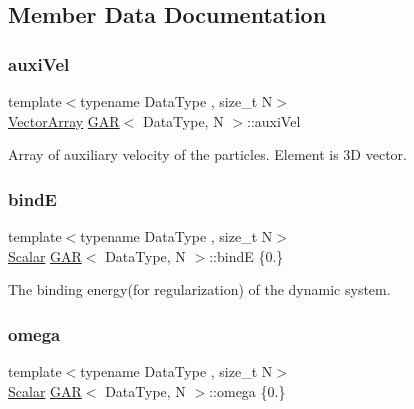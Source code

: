 \subsection{Member Data Documentation}
\mbox{\label{class_g_a_r_ade7c1f936a5f23a0ded2d02b2cc750e6}} 
\subsubsection{\texorpdfstring{auxi\+Vel}{auxiVel}}
{\footnotesize\ttfamily template$<$typename Data\+Type , size\+\_\+t N$>$ \\
\mbox{\hyperlink{class_g_a_r_a5818e17eb203504af6e10f38fc38d378}{Vector\+Array}} \mbox{\hyperlink{class_g_a_r}{G\+AR}}$<$ Data\+Type, N $>$\+::auxi\+Vel}



Array of auxiliary velocity of the particles. Element is 3D vector. 

\mbox{\label{class_g_a_r_a10f49216d9cacb2b21bd053a2ddb997c}} 
\subsubsection{\texorpdfstring{bindE}{bindE}}
{\footnotesize\ttfamily template$<$typename Data\+Type , size\+\_\+t N$>$ \\
\mbox{\hyperlink{class_g_a_r_a2ae44eda8e28d5dd26cf707dcda69314}{Scalar}} \mbox{\hyperlink{class_g_a_r}{G\+AR}}$<$ Data\+Type, N $>$\+::bindE \{0.\}}



The binding energy(for regularization) of the dynamic system. 

\mbox{\label{class_g_a_r_a702f19b87d8754ac66914985d7c8229e}} 
\subsubsection{\texorpdfstring{omega}{omega}}
{\footnotesize\ttfamily template$<$typename Data\+Type , size\+\_\+t N$>$ \\
\mbox{\hyperlink{class_g_a_r_a2ae44eda8e28d5dd26cf707dcda69314}{Scalar}} \mbox{\hyperlink{class_g_a_r}{G\+AR}}$<$ Data\+Type, N $>$\+::omega \{0.\}}



